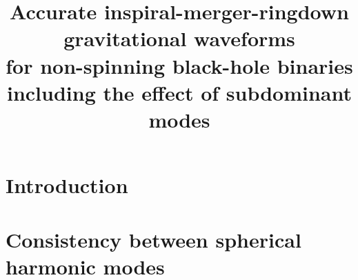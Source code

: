 \documentclass[prd,preprintnumbers,twocolumn,eqsecnum,floatfix,a4paper,nofootinbib,superscriptaddress]{revtex4}
\begin{document}
\newcommand{\be}{\begin{equation}}
\newcommand{\ee}{\end{equation}}
\newcommand{\ber}{\begin{eqnarray}}
\newcommand{\eer}{\end{eqnarray}}
\def\bea{\begin{eqnarray}}
\def\eea{\end{eqnarray}}
\newcommand{\etal}{\emph{et al}}

\title{Accurate inspiral-merger-ringdown gravitational waveforms \\ for non-spinning black-hole binaries including the effect of subdominant modes}

\begin{abstract}
\end{abstract}
\maketitle
\section{Introduction}
\section{Consistency between spherical harmonic modes}
\end{document}
